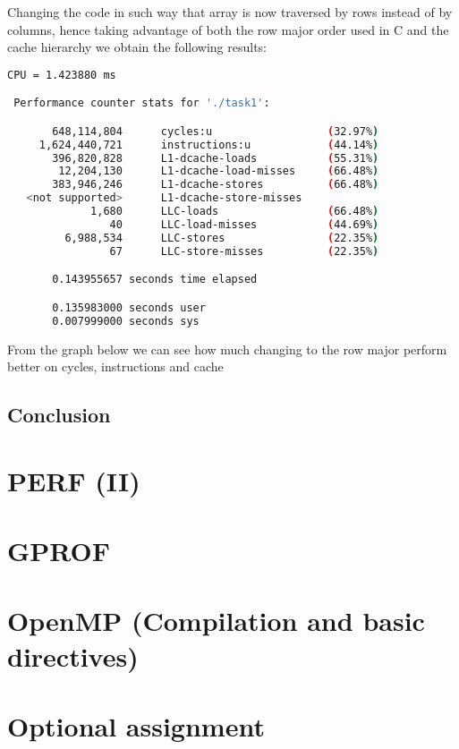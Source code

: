 \documentclass[11pt,a4paper]{article}
\begin{document}
Changing the code in such way that array is now traversed by rows
instead of by columns, hence taking advantage of both the row major order used in C and the cache hierarchy we obtain the following results:
\begin{lstlisting}[language=bash]
CPU = 1.423880 ms 

 Performance counter stats for './task1':

       648,114,804      cycles:u                  (32.97%)
     1,624,440,721      instructions:u            (44.14%)
       396,820,828      L1-dcache-loads           (55.31%)
        12,204,130      L1-dcache-load-misses     (66.48%)
       383,946,246      L1-dcache-stores          (66.48%)
   <not supported>      L1-dcache-store-misses                                      
             1,680      LLC-loads                 (66.48%)
                40      LLC-load-misses           (44.69%)
         6,988,534      LLC-stores                (22.35%)
                67      LLC-store-misses          (22.35%)

       0.143955657 seconds time elapsed

       0.135983000 seconds user
       0.007999000 seconds sys
\end{lstlisting}
From the graph below we can see how much changing to the row major perform better on cycles, instructions and cache 
\subsection{Conclusion}
\newpage
\section{PERF (II)}
\newpage
\section{GPROF}
\newpage
\section{OpenMP (Compilation and basic directives)}
\newpage
\section{Optional assignment}
\end{document}
